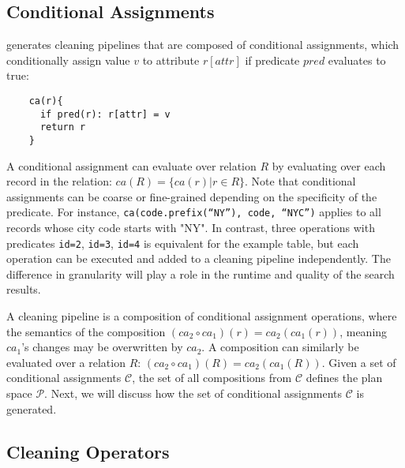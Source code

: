 \subsection{Conditional Assignments}
\sys generates cleaning pipelines that are composed of conditional assignments, which conditionally assign value $v$ to attribute $r[attr]$ if predicate $pred$ evaluates to true:
{\small\begin{verbatim}
    ca(r){
      if pred(r): r[attr] = v 
      return r
    }
\end{verbatim}
}
\noindent A conditional assignment can evaluate over relation $R$ by evaluating over each record in the relation:  $ca(R) = \{ca(r) | r \in R\}$.   Note that conditional assignments can be coarse or fine-grained depending on the specificity of the predicate.  For instance, \texttt{ca(code.prefix(``NY''), code, ``NYC'')} applies to all records whose city code starts with "NY".  In contrast, three operations with predicates  \texttt{id=2}, \texttt{id=3}, \texttt{id=4} is equivalent for the example table, but each operation can be executed and added to a cleaning pipeline independently.  The difference in granularity will play a role in the runtime and quality of the search results.


A cleaning pipeline is a composition of conditional assignment operations, where the semantics of the composition $(ca_2 \circ ca_1)(r) = ca_2(ca_1(r))$, meaning $ca_1$'s changes may be overwritten by $ca_2$.  A composition can similarly be evaluated over a relation $R$: $(ca_2\circ ca_1)(R) = ca_2(ca_1(R))$.    Given a set of conditional assignments $\mathcal{C}$, the set of all compositions from $\mathcal{C}$ defines the plan space $\mathcal{P}$.   Next, we will discuss how the set of conditional assignments $\mathcal{C}$ is generated.


\subsection{Cleaning Operators}



